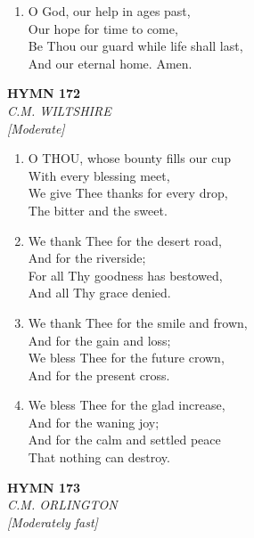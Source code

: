 \documentclass[11pt,a4paper]{article}
\begin{document}
\begin{enumerate}
    \item O God, our help in ages past, \\
        Our hope for time to come, \\
        Be Thou our guard while life shall last, \\
        And our eternal home. Amen.

\end{enumerate}

\newpage
\begin{center}
    {\Large \textbf{HYMN 172}}
    \\
    \textit{C.M. WILTSHIRE}
    \\
    \textit{\small [Moderate]}
\end{center}
\vspace{1em}

\begin{enumerate}
    \item O THOU, whose bounty fills our cup \\
        With every blessing meet, \\
        We give Thee thanks for every drop, \\
        The bitter and the sweet.

    \item We thank Thee for the desert road, \\
        And for the riverside; \\
        For all Thy goodness has bestowed, \\
        And all Thy grace denied.

    \item We thank Thee for the smile and frown, \\
        And for the gain and loss; \\
        We bless Thee for the future crown, \\
        And for the present cross.

    \item We bless Thee for the glad increase, \\
        And for the waning joy; \\
        And for the calm and settled peace \\
        That nothing can destroy.

\end{enumerate}

\newpage
\begin{center}
    {\Large \textbf{HYMN 173}}
    \\
    \textit{C.M. ORLINGTON}
    \\
    \textit{\small [Moderately fast]}
\end{center}
\vspace{1em}
\end{document}
